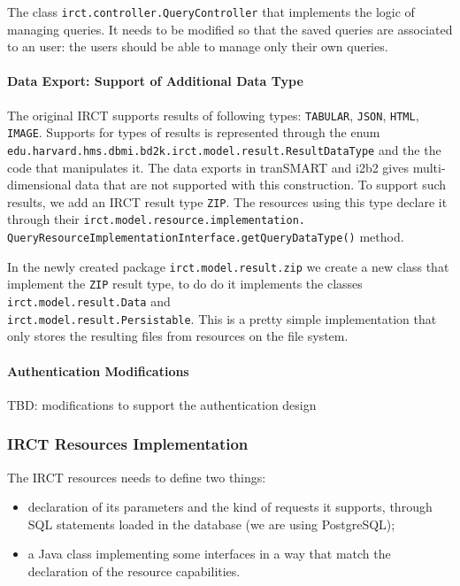 The class \verb|irct.controller.QueryController| that implements the logic of managing queries.
It needs to be modified so that the saved queries are associated to an user: the users should be able to manage only their own queries.

\paragraph{Data Export: Support of Additional Data Type}

The original IRCT supports results of following types: \verb|TABULAR|, \verb|JSON|, \verb|HTML|, \verb|IMAGE|.
Supports for types of results is represented through the enum \verb|edu.harvard.hms.dbmi.bd2k.irct.model.result.ResultDataType| and the the code that manipulates it.
The data exports in tranSMART and i2b2 gives multi-dimensional data that are not supported with this construction.
To support such results, we add an IRCT result type \verb|ZIP|.
The resources using this type declare it through their \verb|irct.model.resource.implementation.| \\
\verb|QueryResourceImplementationInterface.getQueryDataType()| method.

In the newly created package \verb|irct.model.result.zip| we create a new class that implement the \verb|ZIP| result type, to do do it implements the classes
\verb|irct.model.result.Data| and \\
\verb|irct.model.result.Persistable|.
This is a pretty simple implementation that only stores the resulting files from resources on the file system.

\paragraph{Authentication Modifications}
TBD: modifications to support the authentication design


\subsubsection{IRCT Resources Implementation}

The IRCT resources needs to define two things:
\begin{itemize}
    \item declaration of its parameters and the kind of requests it supports, through SQL statements loaded in the database (we are using PostgreSQL);
    \item a Java class implementing some interfaces in a way that match the declaration of the resource capabilities.
\end{itemize}

